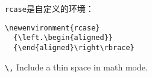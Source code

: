 
\verb|rcase|是自定义的环境：

\begin{verbatim}
\newenvironment{rcase}
  {\left.\begin{aligned}}
  {\end{aligned}\right\rbrace}
\end{verbatim}


\begin{remark*}
\verb|\,| Include a thin space in math mode.
\end{remark*}
